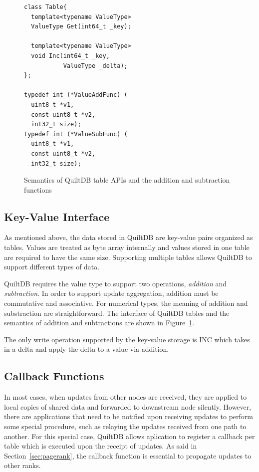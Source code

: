 \documentclass[11pt, twocolumn]{article}
\begin{document}
\begin{figure}[th!]

\begin{lstlisting}
class Table{
  template<typename ValueType>
  ValueType Get(int64_t _key);

  template<typename ValueType>
  void Inc(int64_t _key,
           ValueType _delta);
};

typedef int (*ValueAddFunc) (
  uint8_t *v1,
  const uint8_t *v2,
  int32_t size);
typedef int (*ValueSubFunc) (
  uint8_t *v1,
  const uint8_t *v2,
  int32_t size);
\end{lstlisting}

\caption{Semantics of QuiltDB table APIs and the addition and subtraction
  functions}
\label{fig:table-api}
\end{figure}

\subsection{Key-Value Interface}

As mentioned above, the data stored in QuiltDB are key-value pairs organized
as tables. Values are treated as byte array internally and values stored in one
table are required to have the same size. Supporting multiple tables allows
QuiltDB to support different types of data.

QuiltDB requires the value type to support two operations, \emph{addition} and
\emph{subtraction}. In order to support update aggregation, {addition} must
 be commutative and associative. For numerical types,  the meaning of
{addition} and {substraction} are straightforward. The interface of
QuiltDB tables and the semantics of addition and subtractions are shown in
Figure~\ref{fig:table-api}.

The only write operation supported by the key-value storage is INC which takes
in a delta and apply the delta to a value via {addition}.

\subsection{Callback Functions}
\label{sec:callback}

In most cases, when updates from other nodes are received, they are applied to
local copies of shared data and forwarded to downstream node silently.
However, there are applications that need to be notified upon receiving updates
to perform some special procedure, such as relaying the updates received from
one path to another. For this special case, QuiltDB allows aplication to
register a callback per table which is executed upon the receipt of updates. As
said in Section~\ref{sec:pagerank}, the callback function is essential to
propagate updates to other ranks.
\end{document}
